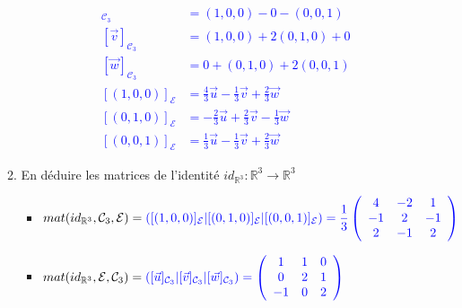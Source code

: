 \documentclass[a4paper,12pt]{article}
\def\R{\mathbb{R}}
\newcommand{\add}[1]{\textcolor{blue}{#1}}
\begin{document}
\begin{exercice}
\begin{enumerate}
\begin{enumerate}
                     \add{
                         \setcounter{equation}{0}
                         \begin{align}
                             [\vec{u}]_{\mathcal C_3}&=(1,0,0)-0-(0,0,1)\\
                             [\vec{v}]_{\mathcal C_3}&=(1,0,0)+2(0,1,0)+0\\
                             [\vec{w}]_{\mathcal C_3}&=0+(0,1,0)+2(0,0,1)\\
                             [(1,0,0)]_{\mathcal E}&=\frac{4}{3} \vec{u} -\frac{1}{3} \vec{v} +\frac{2}{3} \vec{w}\\
                             [(0,1,0)]_{\mathcal E}&=-\frac{2}{3} \vec{u} +\frac{2}{3} \vec{v} -\frac{1}{3} \vec{w}\\
                             [(0,0,1)]_{\mathcal E}&=\frac{1}{3} \vec{u} -\frac{1}{3} \vec{v} +\frac{2}{3} \vec{w}
                         \end{align}
                     }
                 \item En déduire les matrices de l'identité $id_{\R^3} :\R^3 \to \R^3$\\
                     \begin{itemize}
                         \item $ mat(id_{\R^3},\mathcal C_3, \mathcal E) = \add{([(1,0,0)]_{\mathcal E}|[(0,1,0)]_{\mathcal E}|[(0,0,1)]_{\mathcal E})=\dfrac{1}{3}
                             \left(
                             \begin{array}{ccc}
                                 4 & -2 & 1\\
                                 -1 & 2 & -1\\
                                 2 & -1 & 2
                             \end{array}
                             \right)
                             }
                             $

                         \item $ mat(id_{\R^3},\mathcal E, \mathcal C_3) = \add{([\vec{u}]_{\mathcal C_3}|[\vec{v}]_{\mathcal C_3}|[\vec{w}]_{\mathcal C_3})=
                             \left(
                             \begin{array}{ccc}
                                 1 & 1 & 0\\
                                 0 & 2 & 1\\
                                 -1 & 0 & 2
                             \end{array}
                             \right)
                             }$


\end{itemize}
\end{enumerate}
\end{enumerate}
\end{exercice}
\end{document}
